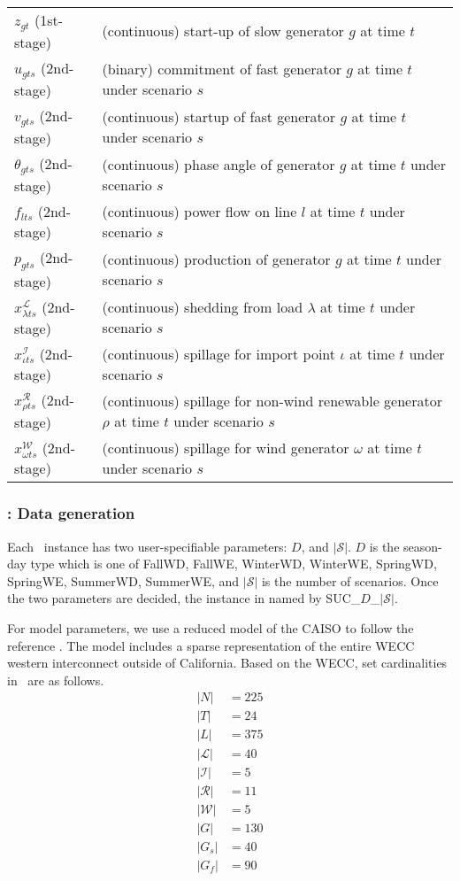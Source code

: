\begin{table}[H]
{\begin{tabular}{ll}
			$z_{gt}$ (1st-stage)	&	(continuous) start-up of slow generator $g$ at time $t$\\
			$u_{gts}$ (2nd-stage)	&	(binary) commitment of fast generator $g$ at time $t$ under scenario $s$\\
			$v_{gts}$ (2nd-stage)	&	(continuous) startup of fast generator $g$ at time $t$ under scenario $s$\\
			$\theta_{gts}$ (2nd-stage)	&	(continuous) phase angle of generator $g$ at time $t$ under scenario $s$\\
			$f_{lts}$ (2nd-stage)	&	(continuous) power flow on line $l$ at time $t$ under scenario $s$\\
			$p_{gts}$ (2nd-stage)	&	(continuous) production of generator $g$ at time $t$ under scenario $s$\\
			$x_{\lambda ts}^\mathcal{L}$	(2nd-stage) & (continuous) shedding from load $\lambda$ at time $t$ under scenario $s$	\\
			$x_{\iota ts}^\mathcal{I}$	(2nd-stage) &	(continuous) spillage for import point $\iota$ at time $t$ under scenario $s$\\
			$x_{\rho ts}^\mathcal{R}$ (2nd-stage)	& (continuous) spillage for non-wind renewable generator $\rho$ at time $t$ under scenario $s$  	\\
			$x_{\omega ts}^\mathcal{W}$ (2nd-stage)	& (continuous) spillage for wind generator $\omega$ at time $t$ under scenario $s$ 	\\
			\hline
		\end{tabular}
	}
\end{table}

\subsubsection{\suc: Data generation}
Each \suc\ instance has two user-specifiable parameters: $D$, and $|\mathcal{S}|$. $D$ is the season-day type which is one of FallWD, FallWE, WinterWD, WinterWE, SpringWD, SpringWE, SummerWD, SummerWE, and $|\mathcal{S}|$ is the number of scenarios. Once the two parameters are decided, the instance in named by SUC\_$D$\_$|\mathcal{S}|$. 

For model parameters, we use a reduced model of the CAISO to follow the reference \cite{journal:PO2013}. The model includes a sparse representation of the entire WECC western interconnect outside of California. 
Based on the WECC, set cardinalities in \suc\ are as follows.
\begin{align*}
|N|&=225 \\
|T|&=24 \\
|L|&=375 \\
|\mathcal{L}|&=40\\
|\mathcal{I}|&=5\\
|\mathcal{R}|&=11\\
|\mathcal{W}|&=5\\
|G|&=130\\
|G_s|&=40\\
|G_f|&=90
\end{align*}

